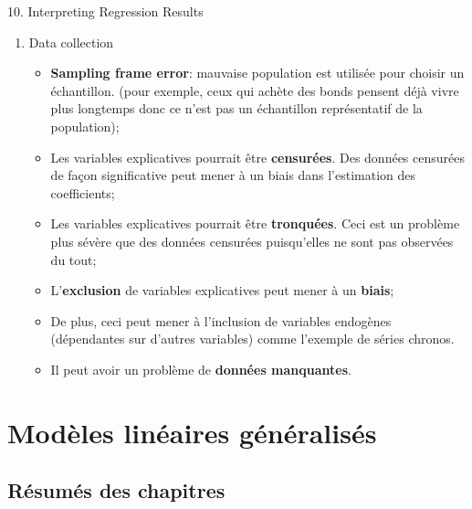 \documentclass[12pt, titlepage, french]{report}
\begin{document}
\begin{CHPT_SUMM}{10. Interpreting Regression Results}
\begin{enumerate}
	\item	Data collection
	\begin{itemize}
		\item	\textbf{Sampling frame error}: mauvaise population est utilisée pour choisir un échantillon. (pour exemple, ceux qui achète des bonds pensent déjà vivre plus longtemps donc ce n'est pas un échantillon représentatif de la population);
		\item	Les variables explicatives pourrait être \textbf{censurées}. Des données censurées de façon significative peut mener à un biais dans l'estimation des coefficients;
		\item	Les variables explicatives pourrait être \textbf{tronquées}. Ceci est un problème plus sévère que des données censurées puisqu'elles ne sont pas observées du tout;
		\item	L'\textbf{exclusion} de variables explicatives peut mener à un \textbf{biais};
		\item[]	De plus, ceci peut mener à l'inclusion de variables endogènes (dépendantes sur d'autres variables) comme l'exemple de séries chronos.
		\item	Il peut avoir un problème de \textbf{données manquantes}.
	\end{itemize}
\end{enumerate}
\end{CHPT_SUMM}

\section{Modèles linéaires généralisés}

\subsection{Résumés des chapitres}
\end{document}

